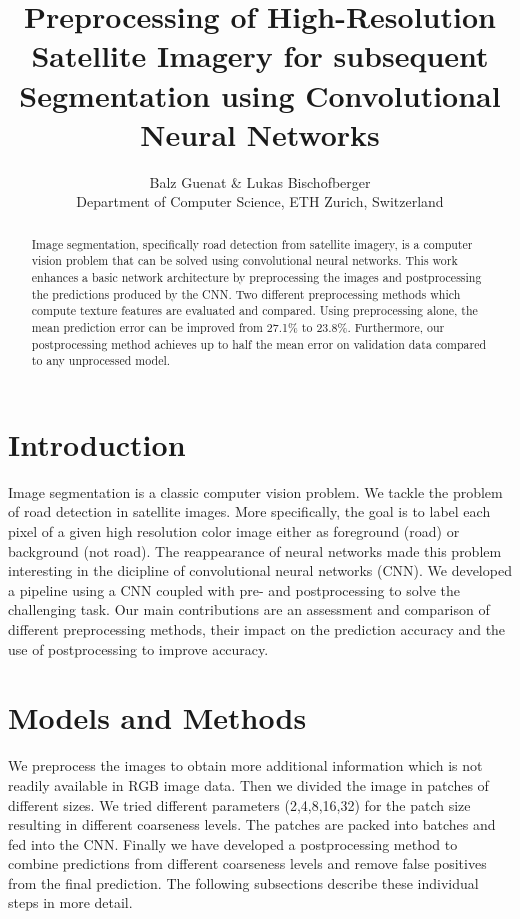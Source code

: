 \documentclass[10pt,conference,compsocconf]{IEEEtran}
\begin{document}
\title{Preprocessing of High-Resolution Satellite Imagery for subsequent \\Segmentation using Convolutional Neural Networks}

\author{
 Balz Guenat \& Lukas Bischofberger\\
  Department of Computer Science, ETH Zurich, Switzerland
}

\maketitle

\begin{abstract}
	Image segmentation, specifically road detection from satellite imagery, is a computer vision problem that can be solved using convolutional neural networks. This work enhances a basic network architecture by preprocessing the images and postprocessing the predictions produced by the CNN. Two different preprocessing methods which compute texture features are evaluated and compared. Using preprocessing alone, the mean prediction error can be improved from 27.1\% to 23.8\%. Furthermore, our postprocessing method achieves up to half the mean error on validation data compared to any unprocessed model.
\end{abstract}

\section{Introduction}
Image segmentation is a classic computer vision problem. We tackle the problem of road detection in satellite images. More specifically, the goal is to label each pixel of a given high resolution color image either as foreground (road) or background (not road). The reappearance of neural networks made this problem interesting in the dicipline of convolutional neural networks (CNN). We developed a pipeline using a CNN coupled with pre- and postprocessing to solve the challenging task. Our main contributions are an assessment and comparison of different preprocessing methods, their impact on the prediction accuracy and the use of postprocessing to improve accuracy.

\section{Models and Methods}
\label{sec:methods}

We preprocess the images to obtain more additional information which is not readily available in RGB image data.
Then we divided the image in patches of different sizes. We tried different parameters (2,4,8,16,32) for the patch size resulting in different coarseness levels. The patches are packed into batches and fed into the CNN. Finally we have developed a postprocessing method to combine predictions from different coarseness levels and remove false positives from the final prediction. The following subsections describe these individual steps in more detail.
\end{document}
